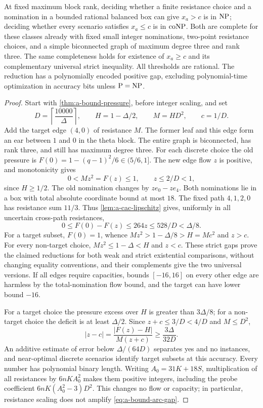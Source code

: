 \begin{theorem}
\label{thm:a-bound-arc-hardness}
At fixed maximum block rank, deciding whether a finite resistance choice
and a nomination in a bounded rational balanced box can give $x_a>c$
is in $\mathrm{NP}$; deciding whether every scenario satisfies $x_a\le c$ is
in $\mathrm{coNP}$. Both are complete for these classes already with fixed
small integer nominations, two-point resistance choices, and a simple
biconnected graph of maximum degree three and rank three. The same
completeness holds for existence of $x_a\ge c$ and its complementary
universal strict inequality. All thresholds are rational. The reduction
has a polynomially encoded positive gap, excluding polynomial-time
optimization in accuracy bits unless $\mathrm P=\mathrm{NP}$.
\end{theorem}
\begin{proof}
Start with \cref{thm:a-bound-pressure}, before integer scaling, and set
\[
 D=\left\lceil\frac{10000}{\Delta}\right\rceil,
 \qquad H=1-\Delta/2,\qquad M=HD^2,\qquad c=1/D.
\]
Add the target edge $(4,0)$ of resistance $M$. The former leaf and this
edge form an ear between $1$ and $0$ in the theta block. The entire
graph is biconnected, has rank three, and still has maximum degree three.
For each discrete choice the old pressure is
$F(0)=1-(q-1)^2/6\in(5/6,1]$.
The new edge flow $z$ is positive, and monotonicity gives
\[
 0<Mz^2=F(z)\le1,\qquad z\le2/D<1,
\]
since $H\ge1/2$. The old nomination changes by $z e_0-z e_4$.
Both nominations lie in a box with total absolute coordinate bound at
most $18$. The fixed path $4,1,2,0$ has resistance sum $11/3$.
Thus \cref{lem:a-cac-lipschitz} gives, uniformly in all uncertain
cross-path resistances,
\begin{equation}
 0\le F(0)-F(z)\le264z\le528/D<\Delta/8.
 \label{eq:a-bound-probe-loss}
\end{equation}
For a target subset, $F(0)=1$, whence $Mz^2>1-\Delta/8>H=Mc^2$
and $z>c$. For every non-target choice,
$Mz^2\le1-\Delta<H$ and $z<c$. These strict gaps prove the claimed
reductions for both weak and strict existential comparisons, without
changing equality conventions, and their complements give the two
universal versions. If all edges require capacities, bounds $[-16,16]$
on every other edge are harmless by the total-nomination flow bound,
and the target can have lower bound $-16$.

For a target choice the pressure excess over $H$ is greater than
$3\Delta/8$; for a non-target choice the deficit is at least
$\Delta/2$. Since $z+c\le3/D<4/D$ and $M\le D^2$,
\begin{equation}
 |z-c|=\frac{|F(z)-H|}{M(z+c)}
       \ge\frac{3\Delta}{32D}.
 \label{eq:a-bound-arc-gap}
\end{equation}
An additive estimate of error below $\Delta/(64D)$ separates yes and
no instances, and near-optimal discrete scenarios identify target
subsets at this accuracy. Every number has polynomial binary length.
Writing $A_0=31K+18S$, multiplication of all resistances by
$6nKA_0^2$ makes them positive integers, including the probe coefficient
$6nK(A_0^2-3)D^2$. This changes no flow or capacity; in particular,
resistance scaling does not amplify \cref{eq:a-bound-arc-gap}.


\end{proof}
